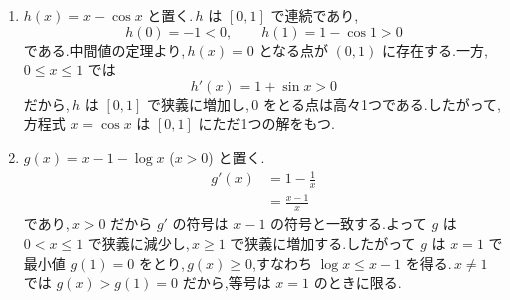 \begin{enumerate}[label=(\arabic*),leftmargin=*]
 \item $h(x)=x-\cos x$ と置く.\,$h$ は $[0,1]$ で連続であり,
 \[
  h(0)=-1<0,\qquad h(1)=1-\cos1>0
 \]
 である.中間値の定理より,\,$h(x)=0$ となる点が $(0,1)$ に存在する.一方,\,$0\le x\le1$ では
 \[
  h'(x)=1+\sin x>0
 \]
 だから,\,$h$ は $[0,1]$ で狭義に増加し,\,$0$ をとる点は高々1つである.したがって,方程式 $x=\cos x$ は $[0,1]$ にただ1つの解をもつ.
 \item $g(x)=x-1-\log x$ ($x>0$) と置く.
 \begin{align*}
  g'(x)&=1-\frac1x\\
  &=\frac{x-1}{x}
 \end{align*}
 であり,\,$x>0$ だから $g'$ の符号は $x-1$ の符号と一致する.よって $g$ は $0<x\le1$ で狭義に減少し,\,$x\ge1$ で狭義に増加する.したがって $g$ は $x=1$ で最小値 $g(1)=0$ をとり,\,$g(x)\ge0$,すなわち $\log x\le x-1$ を得る.\,$x\ne1$ では $g(x)>g(1)=0$ だから,等号は $x=1$ のときに限る.
\end{enumerate}
